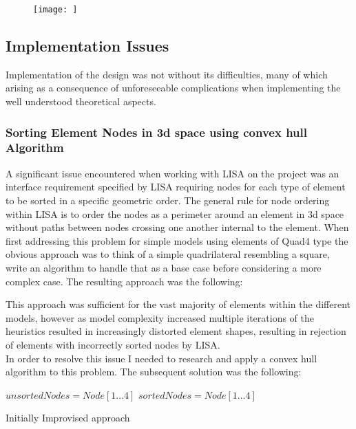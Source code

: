 \documentclass{article}
\begin{document}
\begin{figure}[!h]
  \centerline{\texttt{[image: ]}}
  \caption{}
  \label{fig:h-refinementImp}
\end{figure}


\subsection{Implementation Issues}
Implementation of the design was not without its difficulties, many of which arising as a consequence of unforeseeable complications when implementing the well understood theoretical aspects.


\subsubsection{Sorting Element Nodes in 3d space using convex hull Algorithm}
A significant issue encountered when working with LISA on the project was an interface requirement specified by LISA requiring nodes for each type of element to be sorted in a specific geometric order. The general rule for node ordering within LISA is to order the nodes as a perimeter around an element in 3d space without paths between nodes crossing one another internal to the element. When first addressing this problem for simple models using elements of Quad4 type the obvious approach was to think of a simple quadrilateral resembling a square, write an algorithm to handle that as a base case before considering a more complex case. The resulting approach was the following:

\noindent
This approach was sufficient for the vast majority of elements within the different models, however as model complexity increased multiple iterations of the heuristics resulted in increasingly distorted element shapes, resulting in rejection of elements with incorrectly sorted nodes by LISA. \\
 
\noindent
In order to resolve this issue I needed to research and apply a convex hull algorithm to this problem. The subsequent solution was the following: \\ 

\begin{algorithm}[H]
	
 \State ${unsortedNodes} =  Node[1 \ldots 4]$\;
 \State ${sortedNodes} =  Node[1 \ldots 4]$\;
 
\caption{Initially Improvised approach}
\end{algorithm}
\end{document}
